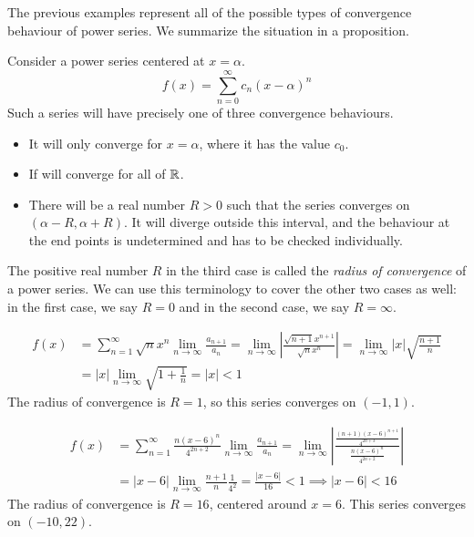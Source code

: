 \documentclass[fleqn,letterpaper]{report}
\begin{document}
The previous examples represent all of the possible types of
convergence behaviour of power series. We summarize the
situation in a proposition.

\begin{prop}
Consider a power series centered at $x = \alpha$.
\begin{equation*}
f(x) = \sum_{n=0}^\infty c_n (x-\alpha)^n
\end{equation*}
Such a series will have precisely one of three convergence
behaviours.
\begin{itemize}
\item It will only converge for $x = \alpha$, where it has the
value $c_0$. 
\item If will converge for all of $\mathbb{R}$.
\item There will be a real number $R>0$ such that the series
converges on $(\alpha - R, \alpha + R)$. It will diverge
outside this interval, and the behaviour at the end points is
undetermined and has to be checked individually.
\end{itemize}
\end{prop}

\begin{defn} 
The positive real number $R$ in the third case is called the
\emph{radius of convergence} of a power series. We can use
this terminology to cover the other two cases as well: in the
first case, we say $R=0$ and in the second case, we say $R =
\infty$. 
\end{defn}

\begin{example}
\begin{align*}
f(x) & = \sum_{n=1}^\infty \sqrt{n} x^n 
\lim_{n \rightarrow \infty} \frac{a_{n+1}}{a_n} = 
\lim_{n \rightarrow \infty} 
\left| \frac{\sqrt{n+1}x^{n+1}}{\sqrt{n} x^n} \right| 
= \lim_{n \rightarrow \infty} |x| \sqrt{\frac{n+1}{n}} \\
& = |x| \lim_{n \rightarrow \infty} \sqrt{ 1 + \frac{1}{n} } =
|x| < 1
\end{align*}
The radius of convergence is $R=1$, so this series converges on $(-1,1)$.
\end{example}

\begin{example}
\begin{align*}
f(x) & = \sum_{n=1}^\infty \frac{n(x-6)^n}{4^{2n+2}}
\lim_{n \rightarrow \infty} \frac{a_{n+1}}{a_n} = 
\lim_{n \rightarrow \infty} \left|
\frac{\frac{(n+1)(x-6)^{n+1}}{4^{2n+3}}}{\frac{n(x-6)^n}{4^{2n+2}}}
\right|
\\
& = |x-6| \lim_{n \rightarrow \infty} \frac{n+1}{n}
\frac{1}{4^2} = \frac{|x-6|}{16} < 1 \implies
|x-6| < 16
\end{align*}
The radius of convergence is $R=16$, centered around
$x=6$. This series converges on $(-10, 22)$.
\end{example}
\end{document}
